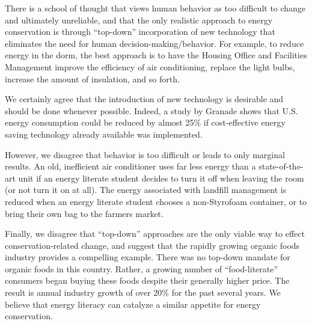 \documentclass[11pt]{article}
\begin{document}
There is a school of thought that views human behavior as too difficult to
change and ultimately unreliable, and that the only realistic approach to
energy conservation is through ``top-down'' incorporation of new technology
that eliminates the need for human decision-making/behavior.  For example,
to reduce energy in the dorm, the best approach is to have the Housing
Office and Facilities Management improve the efficiency of air
conditioning, replace the light bulbs, increase the amount of insulation,
and so forth.

We certainly agree that the introduction of new technology is desirable and
should be done whenever possible.  Indeed, a study by Granade \cite{Granade09}
shows that U.S. energy consumption could be reduced by almost 25\% if
cost-effective energy saving technology already available was implemented.

However, we disagree that behavior is too difficult or leads to only
marginal results.  An old, inefficient air conditioner uses far less energy
than a state-of-the-art unit if an energy literate student decides to turn
it off when leaving the room (or not turn it on at all).  The energy associated with landfill
management is reduced when an energy literate student chooses a
non-Styrofoam container, or to bring their own bag to the farmers market.

Finally, we disagree that ``top-down'' approaches are the only viable way
to effect conservation-related change, and suggest that the rapidly growing
organic foods industry provides a compelling example.  There was no
top-down mandate for organic foods in this country. Rather, a growing
number of ``food-literate'' consumers began buying these foods despite
their generally higher price.  The result is annual industry growth of over
20\% for the past several years.  We believe that energy literacy can
catalyze a similar appetite for energy conservation.




\end{document}

